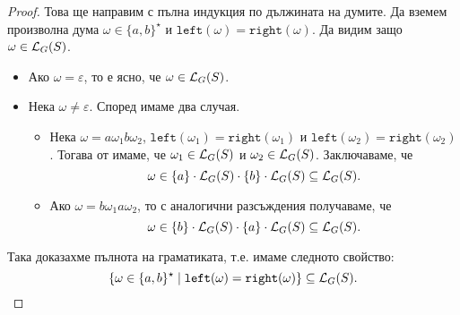 \begin{proof}
  Това ще направим с пълна индукция по дължината на думите.
  Да вземем произволна дума $\omega \in \{a,b\}^\star$ и $\texttt{left}(\omega) = \texttt{right}(\omega)$.
  Да видим защо $\omega \in \mathcal{L}_G(S)$.
  \begin{itemize}
  \item 
    Ако $\omega = \varepsilon$, то е ясно, че $\omega \in \mathcal{L}_G(S)$.
  \item
    Нека $\omega \neq \varepsilon$. Според  имаме два случая.
    \begin{itemize}
    \item
      Нека $\omega = a \omega_1 b \omega_2$, $\texttt{left}(\omega_1) = \texttt{right}(\omega_1)$ и $\texttt{left}(\omega_2) = \texttt{right}(\omega_2)$.
      Тогава от \IndHyp имаме, че $\omega_1 \in \mathcal{L}_G(S)$ и $\omega_2 \in \mathcal{L}_G(S)$. Заключаваме, че
      \[\omega \in \{a\} \cdot \mathcal{L}_G(S) \cdot \{b\} \cdot \mathcal{L}_G(S) \subseteq \mathcal{L}_G(S).\]
    \item
      Ако $\omega = b \omega_1 a \omega_2$, то с аналогични разсъждения получаваме, че
      \[\omega \in \{b\} \cdot \mathcal{L}_G(S) \cdot \{a\} \cdot \mathcal{L}_G(S) \subseteq \mathcal{L}_G(S).\]
    \end{itemize}
  \end{itemize}
  Така доказахме пълнота на граматиката, т.е. имаме следното свойство:
  \[\{\omega \in \{a,b\}^\star \mid \texttt{left}(\omega) = \texttt{right}(\omega)\} \subseteq \mathcal{L}_G(S).\]
\end{proof}


